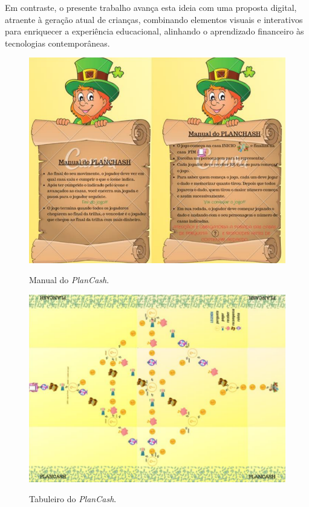Em contraste, o presente trabalho avança esta ideia com uma proposta digital, atraente à geração atual de crianças, combinando elementos visuais e interativos para enriquecer a experiência educacional, alinhando o aprendizado financeiro às tecnologias contemporâneas.

\begin{figure}[ht]
	\centering
	\caption{Manual do \textit{PlanCash}.}
	\includegraphics[scale=0.5]{Textuais/Pictures/Plancash-1.png}
	\label{fig:plancash-1}
\end{figure}

\begin{figure}[ht]
	\centering
	\caption{Tabuleiro do \textit{PlanCash}.}
	\includegraphics[scale=0.5]{Textuais/Pictures/Plancash-2.png}
	\label{fig:plancash-2}
\end{figure}

